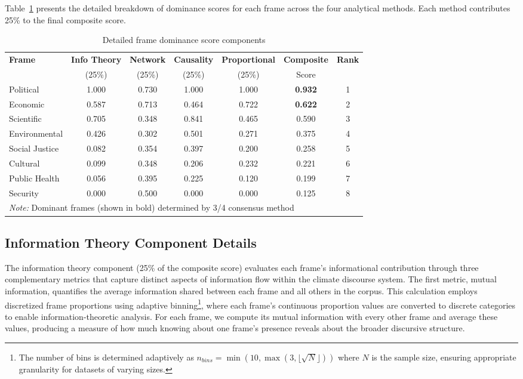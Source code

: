\documentclass[12pt]{article}
\begin{document}
Table~\ref{tab:dominance_components} presents the detailed breakdown of dominance scores for each frame across the four analytical methods. Each method contributes 25\% to the final composite score.

\begin{table}[h!]
\centering
\caption{Detailed frame dominance score components}
\label{tab:dominance_components}
\begin{tabular}{lcccccc}
\toprule
\textbf{Frame} & \textbf{Info Theory} & \textbf{Network} & \textbf{Causality} & \textbf{Proportional} & \textbf{Composite} & \textbf{Rank} \\
& (25\%) & (25\%) & (25\%) & (25\%) & Score & \\
\midrule
Political & 1.000 & 0.730 & 1.000 & 1.000 & \textbf{0.932} & 1 \\
Economic & 0.587 & 0.713 & 0.464 & 0.722 & \textbf{0.622} & 2 \\
Scientific & 0.705 & 0.348 & 0.841 & 0.465 & 0.590 & 3 \\
Environmental & 0.426 & 0.302 & 0.501 & 0.271 & 0.375 & 4 \\
Social Justice & 0.082 & 0.354 & 0.397 & 0.200 & 0.258 & 5 \\
Cultural & 0.099 & 0.348 & 0.206 & 0.232 & 0.221 & 6 \\
Public Health & 0.056 & 0.395 & 0.225 & 0.120 & 0.199 & 7 \\
Security & 0.000 & 0.500 & 0.000 & 0.000 & 0.125 & 8 \\
\bottomrule
\multicolumn{7}{l}{\footnotesize \textit{Note:} Dominant frames (shown in bold) determined by 3/4 consensus method}
\end{tabular}
\end{table}

\subsection{Information Theory Component Details}

The information theory component (25\% of the composite score) evaluates each frame's informational contribution through three complementary metrics that capture distinct aspects of information flow within the climate discourse system. The first metric, mutual information, quantifies the average information shared between each frame and all others in the corpus. This calculation employs discretized frame proportions using adaptive binning\footnote{The number of bins is determined adaptively as $n_{bins} = \min(10, \max(3, \lfloor\sqrt{N}\rfloor))$ where $N$ is the sample size, ensuring appropriate granularity for datasets of varying sizes.}, where each frame's continuous proportion values are converted to discrete categories to enable information-theoretic analysis. For each frame, we compute its mutual information with every other frame and average these values, producing a measure of how much knowing about one frame's presence reveals about the broader discursive structure.
\end{document}
